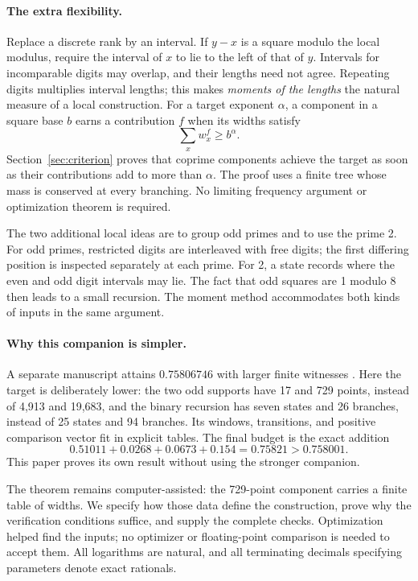 \documentclass[11pt]{article}
\theoremstyle{definition}
\theoremstyle{remark}
\begin{document}
\paragraph{The extra flexibility.}
Replace a discrete rank by an interval. If $y-x$ is a square modulo the
local modulus, require the interval of $x$ to lie to the left of that of
$y$. Intervals for incomparable digits may overlap, and their lengths
need not agree. Repeating digits multiplies interval lengths; this makes
\emph{moments of the lengths} the natural measure of a local construction.
For a target exponent $\alpha$, a component in a square base $b$ earns a
contribution $f$ when its widths satisfy
\[
 \sum_x w_x^f\ge b^\alpha.
\]
Section~\ref{sec:criterion} proves that coprime components achieve the target
as soon as their contributions add to more than $\alpha$. The proof uses
a finite tree whose mass is conserved at every branching. No limiting
frequency argument or optimization theorem is required.

The two additional local ideas are to group odd primes and to use the
prime 2. For odd primes, restricted digits are interleaved with free digits;
the first differing position is inspected separately at each prime.
For 2, a state records where the even and odd digit intervals may lie.
The fact that odd squares are 1 modulo 8 then leads to a small recursion.
The moment method accommodates both kinds of inputs in the same argument.

\paragraph{Why this companion is simpler.}
A separate manuscript attains $0.75806746$ with larger finite witnesses
\cite{NaslundCompanion2026}. Here the target is deliberately lower:
the two odd supports have 17 and 729 points, instead of 4,913 and 19,683,
and the binary recursion has seven states and 26 branches, instead of
25 states and 94 branches. Its windows, transitions, and positive comparison
vector fit in explicit tables. The final budget is the exact addition
\begin{equation}\label{eq:budgetintro}
 0.51011+0.0268+0.0673+0.154=0.75821>0.758001.
\end{equation}
This paper proves its own result without using the stronger companion.

The theorem remains computer-assisted: the 729-point component carries a
finite table of widths. We specify how those data define the construction,
prove why the verification conditions suffice, and supply the complete
checks. Optimization helped find the inputs; no optimizer or floating-point
comparison is needed to accept them. All logarithms are natural, and all
terminating decimals specifying parameters denote exact rationals.
\end{document}
